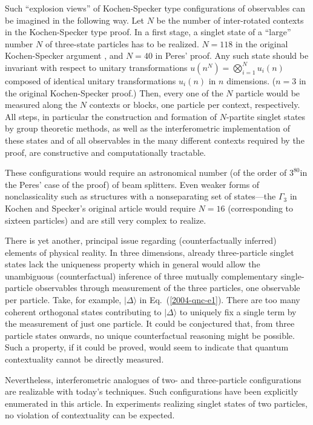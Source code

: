 \documentclass[12pt]{iopart}
\begin{document}
Such
``explosion views'' of  Kochen-Specker
type configurations of observables can be imagined in the following way.
Let $N$ be the number of inter-rotated contexts in the Kochen-Specker type proof.
In a first stage, a singlet state of a ``large'' number $N$
of three-state particles has to be realized.
$N=118$ in the original
Kochen-Specker argument \cite{kochen1},
and $N=40$ in Peres'  \cite{peres,svozil-tkadlec} proof.
Any such state should be invariant with respect to unitary transformations
$u(n^N)=\bigotimes_{i=1}^N u_i(n)$ composed of identical unitary
transformations $u_i(n)$ in $n$ dimensions.
($n=3$ in the original Kochen-Specker proof.)
Then, every one of the $N$ particle would be measured along
the $N$ contexts or blocks,  one particle per context, respectively.
All steps, in particular the construction and formation of $N$-partite singlet states
by group theoretic methods,
as well as the interferometric implementation of these states
and of all observables in the many different contexts required by the
proof, are constructive and computationally tractable.

These  configurations
would require an astronomical number (of the order of $3^{80}$in the Peres' case of the proof)
of beam splitters.
Even weaker forms of nonclassicality such as structures with
a nonseparating set of states---the $\Gamma_3$ in Kochen and Specker's original article
\cite{kochen1} would require $N=16$ (corresponding to sixteen particles)
and are still very complex to realize.

There is yet another, principal issue regarding (counterfactually inferred) elements of physical reality.
In three dimensions, already three-particle singlet states lack the uniqueness property  \cite{svozil-2004-qnc}
which in general would allow the
unambiguous (counterfactual) inference of three mutually complementary single-particle observables through
measurement of the three particles, one observable per particle.
Take, for example,  $\vert \Delta \rangle$ in Eq.~(\ref{2004-qnc-e1}).
There are too many coherent
orthogonal states contributing to  $\vert \Delta \rangle$ to uniquely fix a single term by the measurement of just
one particle.
It could be conjectured that, from three particle states onwards,
no unique counterfactual reasoning might be possible.
Such a property, if it could be proved, would seem to indicate that quantum
contextuality cannot be directly measured.

Nevertheless, interferometric analogues of two- and three-particle
configurations are realizable with today's techniques.
Such configurations have been explicitly enumerated in this article.
In experiments realizing singlet states of two particles,
no violation of contextuality can be expected.
\end{document}
